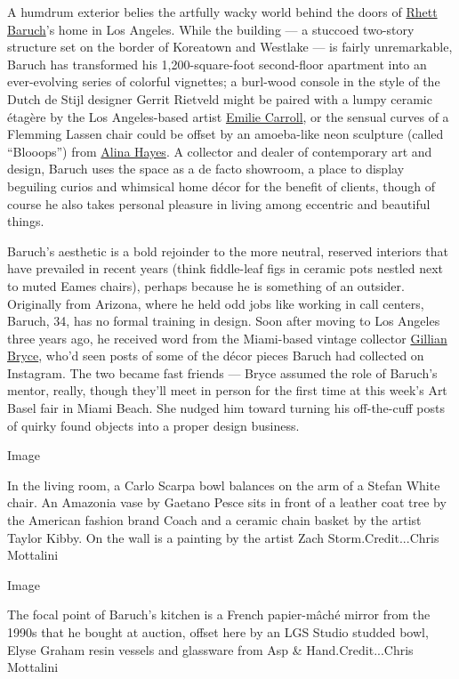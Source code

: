A humdrum exterior belies the artfully wacky world behind the doors of
\href{http://rhettbaruch.com/}{Rhett Baruch}'s home in Los Angeles.
While the building --- a stuccoed two-story structure set on the border
of Koreatown and Westlake --- is fairly unremarkable, Baruch has
transformed his 1,200-square-foot second-floor apartment into an
ever-evolving series of colorful vignettes; a burl-wood console in the
style of the Dutch de Stijl designer Gerrit Rietveld might be paired
with a lumpy ceramic étagère by the Los Angeles-based artist
\href{https://www.emiliecarroll.com/}{Emilie Carroll}, or the sensual
curves of a Flemming Lassen chair could be offset by an amoeba-like neon
sculpture (called ``Blooops'') from
\href{https://www.alinahayes.com/}{Alina Hayes}. A collector and dealer
of contemporary art and design, Baruch uses the space as a de facto
showroom, a place to display beguiling curios and whimsical home décor
for the benefit of clients, though of course he also takes personal
pleasure in living among eccentric and beautiful things.

Baruch's aesthetic is a bold rejoinder to the more neutral, reserved
interiors that have prevailed in recent years (think fiddle-leaf figs in
ceramic pots nestled next to muted Eames chairs), perhaps because he is
something of an outsider. Originally from Arizona, where he held odd
jobs like working in call centers, Baruch, 34, has no formal training in
design. Soon after moving to Los Angeles three years ago, he received
word from the Miami-based vintage collector
\href{https://www.instagram.com/gillianbryce/}{Gillian Bryce}, who'd
seen posts of some of the décor pieces Baruch had collected on
Instagram. The two became fast friends --- Bryce assumed the role of
Baruch's mentor, really, though they'll meet in person for the first
time at this week's Art Basel fair in Miami Beach. She nudged him toward
turning his off-the-cuff posts of quirky found objects into a proper
design business.

Image

In the living room, a Carlo Scarpa bowl balances on the arm of a Stefan
White chair. An Amazonia vase by Gaetano Pesce sits in front of a
leather coat tree by the American fashion brand Coach and a ceramic
chain basket by the artist Taylor Kibby. On the wall is a painting by
the artist Zach Storm.Credit...Chris Mottalini

Image

The focal point of Baruch's kitchen is a French papier-mâché mirror from
the 1990s that he bought at auction, offset here by an LGS Studio
studded bowl, Elyse Graham resin vessels and glassware from Asp \&
Hand.Credit...Chris Mottalini

